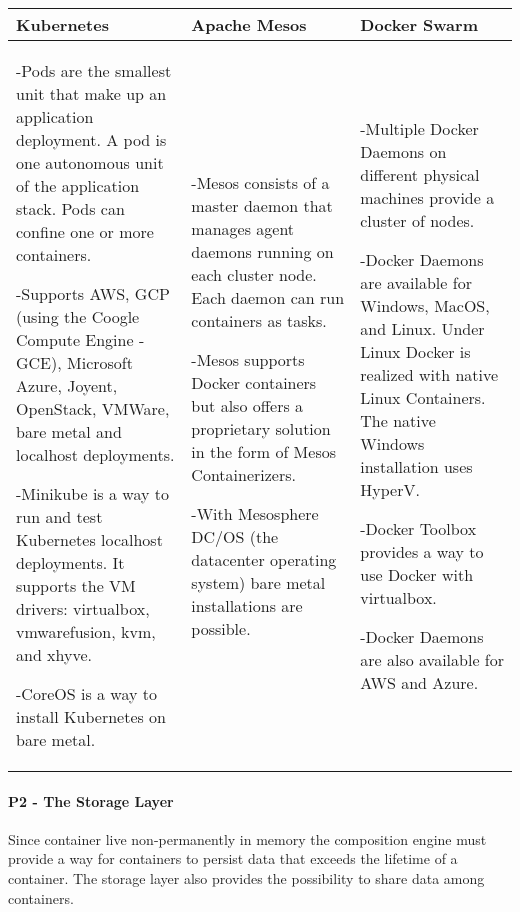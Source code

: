 \begin{center}
  \begin{tabular}{ | p{4.5cm} | p{4.5cm} | p{4.5cm} | }
    \hline
    \textbf{Kubernetes}&\textbf{Apache Mesos}&\textbf{Docker Swarm}\\\hline
    -Pods are the smallest unit that make up an application deployment. A pod is
    one autonomous unit of the application stack. Pods can confine one or more
    containers.
    
    -Supports AWS, GCP (using the Coogle Compute Engine - GCE), Microsoft Azure,
    Joyent, OpenStack, VMWare, bare metal and localhost deployments.
    
    -Minikube is a way to run and test Kubernetes localhost deployments. It
    supports the VM drivers: virtualbox, vmwarefusion, kvm, and xhyve.
    
    -CoreOS is a way to install Kubernetes on bare metal.&
    
    -Mesos consists of a master daemon that manages agent daemons running on
    each cluster node. Each daemon can run containers as tasks. 
    
    -Mesos supports Docker containers but also offers a proprietary solution in
    the form of Mesos Containerizers.
    
    -With Mesosphere DC/OS (the datacenter operating system) bare metal
    installations are possible. &
    
    -Multiple Docker Daemons on different physical machines provide a cluster
    of nodes.
    
    -Docker Daemons are available for Windows, MacOS, and Linux. Under Linux
    Docker is realized with native Linux Containers. The native Windows
    installation uses HyperV.
    
    -Docker Toolbox provides a way to use Docker with virtualbox.
    
    -Docker Daemons are also available for AWS and Azure.\\
    \hline
  \end{tabular}
\end{center}


\newpage
\paragraph{P2 - The Storage Layer}

Since container live non-permanently in memory the composition engine must
provide a way for containers to persist data that exceeds the lifetime of a
container. The storage layer also provides the possibility to share data among
containers.

